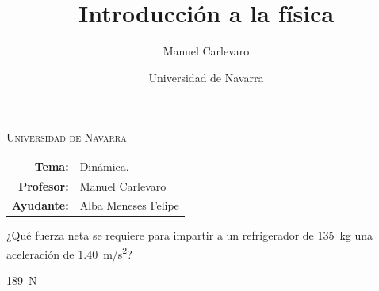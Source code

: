 \documentclass[11pt]{article}
\title{Introducción a la física}
\author{Manuel Carlevaro}
\date{Universidad de Navarra}
\begin{document}

\begin{center}
\end{center} 

\begin{center}
\vspace{1em}
\Large{\textsc{Universidad de Navarra}} 
\end{center}

 \vspace{1em}

\begin{center}
\begin{tabular}{r l}
 \textbf{Tema:} & Dinámica.\\
 \textbf{Profesor:} & Manuel Carlevaro \\
 \textbf{Ayudante:} & Alba Meneses Felipe
\end{tabular}\end{center}

\vspace{2em}

\begin{multicols}{2}
\begin{exercise}
    ¿Qué fuerza neta se requiere para impartir a un refrigerador de \qty{135}{kg} una aceleración de \qty{1.40}{m/s^2}?
\end{exercise}
\begin{solution}
    \qty{189}{N}
\end{solution}
\end{multicols}
\end{document}
